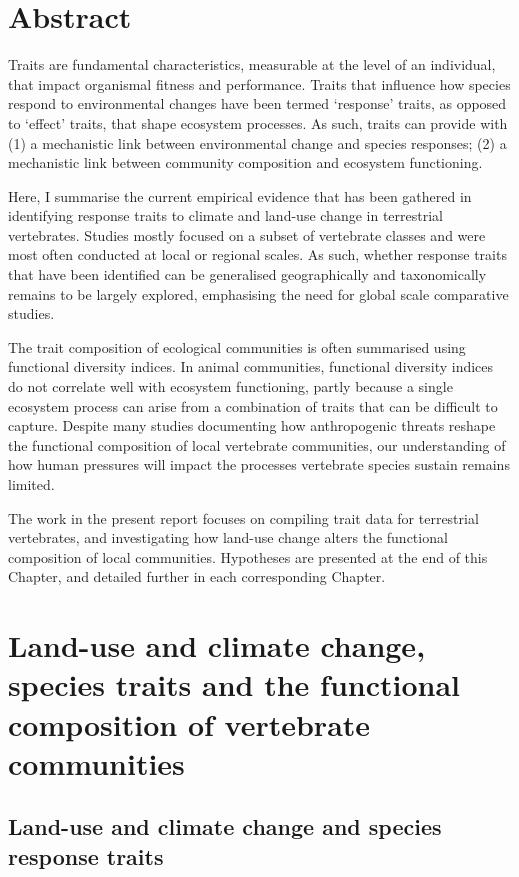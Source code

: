 \section*{Abstract}
Traits are fundamental characteristics, measurable at the level of an individual, that impact organismal fitness and performance. Traits that influence how species respond to environmental changes have been termed `response' traits, as opposed to `effect' traits, that shape ecosystem processes. As such, traits can provide with (1) a mechanistic link between environmental change and species responses; (2) a mechanistic link between community composition and ecosystem functioning. 

Here, I summarise the current empirical evidence that has been gathered in identifying response traits to climate and land-use change in terrestrial vertebrates. Studies mostly focused on a subset of vertebrate classes and were most often conducted at local or regional scales. As such, whether response traits that have been identified can be generalised geographically and taxonomically remains to be largely explored, emphasising the need for global scale comparative studies. 

The trait composition of ecological communities is often summarised using functional diversity indices. In animal communities, functional diversity indices do not correlate well with ecosystem functioning, partly because a single ecosystem process can arise from a combination of traits that can be difficult to capture. Despite many studies documenting how anthropogenic threats reshape the functional composition of local vertebrate communities, our understanding of how human pressures will impact the processes vertebrate species sustain remains limited. 

The work in the present report focuses on compiling trait data for terrestrial vertebrates, and investigating how land-use change alters the functional composition of local communities. Hypotheses are presented at the end of this Chapter, and detailed further in each corresponding Chapter.

\section{Land-use and climate change, species traits and the functional composition of vertebrate communities}

\subsection{Land-use and climate change and species response traits}

